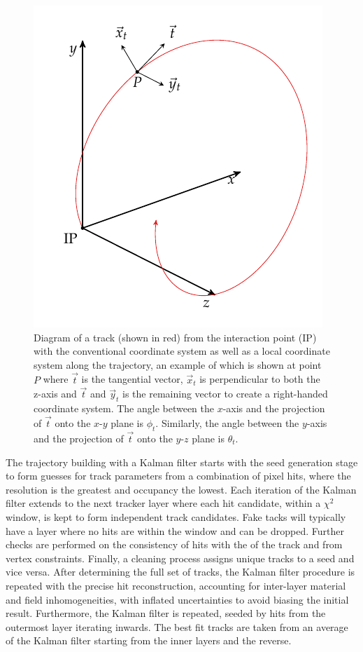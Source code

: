 \begin{figure}
    \centering
    \includegraphics{diagrams/tikz/kf_parameters/kf_parameters.pdf}
    \caption{
        Diagram of a track (shown in red) from the interaction point (IP) with
        the conventional \CMS coordinate system as well as a local coordinate
        system along the trajectory, an example of which is shown at point $P$
        where $\vec{t}$ is the tangential vector, $\vec{x}_{t}$ is
        perpendicular to both the z-axis and $\vec{t}$ and $\vec{y}_{t}$ is
        the remaining vector to create a right-handed coordinate system. The
        angle between the $x$-axis and the projection of ${\vec{t}}$ onto the
        $x$-$y$ plane is $\phi_t$. Similarly, the angle between the $y$-axis
        and the projection of ${\vec{t}}$ onto the $y$-$z$ plane is $\theta_t$.
    }
    \label{fig:kf_parameters}
\end{figure}

The trajectory building with a Kalman filter starts with the seed generation
stage to form guesses for track parameters from a combination of pixel hits,
where the resolution is the greatest and occupancy the lowest. Each iteration
of the Kalman filter extends to the next tracker layer where each hit
candidate, within a $\chi^2$ window, is kept to form independent track
candidates. Fake tacks will typically have a layer where no hits are within
the window and can be dropped. Further checks are performed on the consistency
of hits with the \pt of the track and from vertex constraints. Finally, a
cleaning process assigns unique tracks to a seed and vice versa. After determining the full set of tracks, the Kalman filter procedure is repeated with the precise hit reconstruction, accounting for inter-layer material and field inhomogeneities, with inflated uncertainties to avoid biasing the initial result. Furthermore, the Kalman filter is repeated, seeded by hits from the outermost layer iterating inwards. The best fit tracks are taken from an average of the Kalman filter starting from the inner layers and the reverse.

